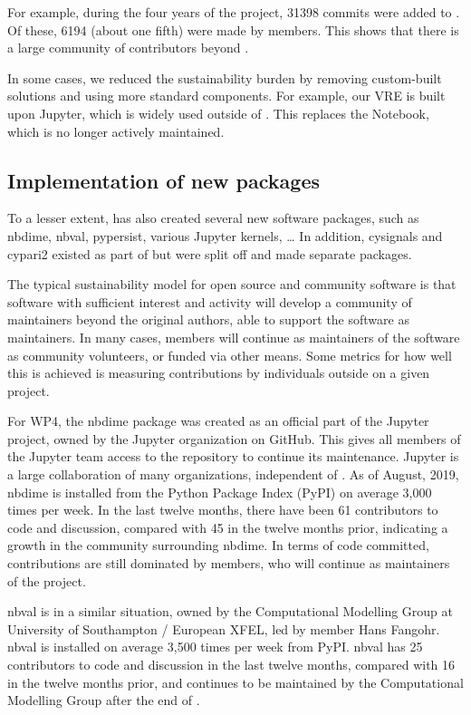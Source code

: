 \documentclass{deliverablereport}
\begin{document}
For example, during the four years of the \ODK project,
31398 commits were added to \Sage.
Of these, 6194
(about one fifth)  %
were made by \ODK members.
This shows that there is a large community of contributors beyond \ODK.

In some cases, we reduced the sustainability burden by removing
custom-built solutions and using more standard components.
For example, our VRE is built upon Jupyter, which is widely used
outside of \ODK.
This replaces the \Sage Notebook, which is no longer actively maintained.

\subsection{Implementation of new packages}

To a lesser extent,
\ODK has also created several new software packages,
such as nbdime, nbval, pypersist, various Jupyter kernels, \ldots
In addition, cysignals and cypari2 existed as part of \Sage but were split
off and made separate packages.

The typical sustainability model for open source and community software
is that software with sufficient interest and activity will develop
a community of maintainers beyond the original authors,
able to support the software as maintainers.
In many cases, \ODK members will continue as maintainers of the software
as community volunteers, or funded via other means.
Some metrics for how well this is achieved is measuring contributions
by individuals outside \ODK on a given project.

For WP4, the nbdime package was created as an official part of the Jupyter project,
owned by the Jupyter organization on GitHub.
This gives all members of the Jupyter team access to the repository to continue its maintenance.
Jupyter is a large collaboration of many organizations, independent of \ODK.
As of August, 2019, nbdime is installed from the Python Package Index (PyPI) on average 3,000 times per week.
In the last twelve months, there have been 61 contributors to code and discussion, compared with 45 in the twelve months prior,
indicating a growth in the community surrounding nbdime.
In terms of code committed, contributions are still dominated by \ODK members,
who will continue as maintainers of the project.

nbval is in a similar situation,
owned by the Computational Modelling Group at University of Southampton / European XFEL,
led by \ODK member Hans Fangohr.
nbval is installed on average 3,500 times per week from PyPI.
nbval has 25 contributors to code and discussion in the last twelve months,
compared with 16 in the twelve months prior,
and continues to be maintained by the Computational Modelling Group after the end of \ODK.
\end{document}
